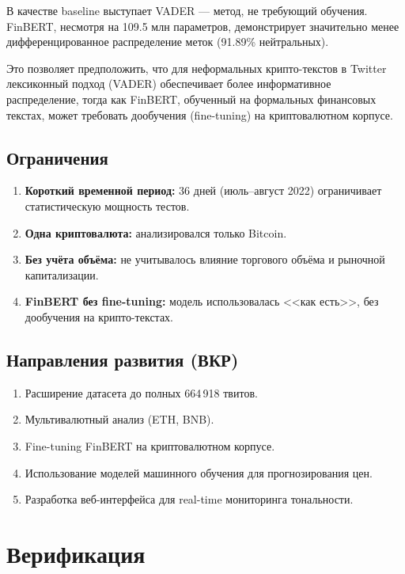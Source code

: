 \documentclass[a4paper,12pt]{article}
\begin{document}
В качестве baseline выступает VADER --- метод, не требующий обучения.
FinBERT, несмотря на 109.5 млн параметров, демонстрирует значительно
менее дифференцированное распределение меток (91.89\% нейтральных).

Это позволяет предположить, что для неформальных крипто-текстов в Twitter
лексиконный подход (VADER) обеспечивает более информативное распределение,
тогда как FinBERT, обученный на формальных финансовых текстах,
может требовать дообучения (fine-tuning) на криптовалютном корпусе.

\subsection{Ограничения}

\begin{enumerate}
  \item \textbf{Короткий временной период:} 36 дней (июль--август 2022)
        ограничивает статистическую мощность тестов.
  \item \textbf{Одна криптовалюта:} анализировался только Bitcoin.
  \item \textbf{Без учёта объёма:} не учитывалось влияние торгового объёма
        и рыночной капитализации.
  \item \textbf{FinBERT без fine-tuning:} модель использовалась <<как есть>>,
        без дообучения на крипто-текстах.
\end{enumerate}

\subsection{Направления развития (ВКР)}

\begin{enumerate}
  \item Расширение датасета до полных 664\,918 твитов.
  \item Мультивалютный анализ (ETH, BNB).
  \item Fine-tuning FinBERT на криптовалютном корпусе.
  \item Использование моделей машинного обучения для прогнозирования цен.
  \item Разработка веб-интерфейса для real-time мониторинга тональности.
\end{enumerate}


\section{Верификация}
\end{document}
